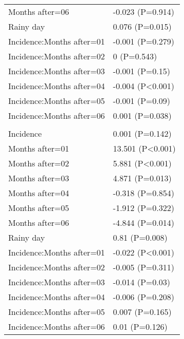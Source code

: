 \documentclass[]{article}
\begin{document}
\begin{longtable}[t]{ll}
\hspace{1em}Months after=06 & -0.023 (P=0.914)\\
\hspace{1em}Rainy day & 0.076 (P=0.015)\\
\hspace{1em}Incidence:Months after=01 & -0.001 (P=0.279)\\
\hspace{1em}Incidence:Months after=02 & 0 (P=0.543)\\
\hspace{1em}Incidence:Months after=03 & -0.001 (P=0.15)\\
\hspace{1em}Incidence:Months after=04 & -0.004 (P<0.001)\\
\hspace{1em}Incidence:Months after=05 & -0.001 (P=0.09)\\
\hspace{1em}Incidence:Months after=06 & 0.001 (P=0.038)\\
\addlinespace[1.5em]
\multicolumn{2}{l}{\textbf{Temporary not field worker}}\\
\hspace{1em}Incidence & 0.001 (P=0.142)\\
\hspace{1em}Months after=01 & 13.501 (P<0.001)\\
\hspace{1em}Months after=02 & 5.881 (P<0.001)\\
\hspace{1em}Months after=03 & 4.871 (P=0.013)\\
\hspace{1em}Months after=04 & -0.318 (P=0.854)\\
\hspace{1em}Months after=05 & -1.912 (P=0.322)\\
\hspace{1em}Months after=06 & -4.844 (P=0.014)\\
\hspace{1em}Rainy day & 0.81 (P=0.008)\\
\hspace{1em}Incidence:Months after=01 & -0.022 (P<0.001)\\
\hspace{1em}Incidence:Months after=02 & -0.005 (P=0.311)\\
\hspace{1em}Incidence:Months after=03 & -0.014 (P=0.03)\\
\hspace{1em}Incidence:Months after=04 & -0.006 (P=0.208)\\
\hspace{1em}Incidence:Months after=05 & 0.007 (P=0.165)\\
\hspace{1em}Incidence:Months after=06 & 0.01 (P=0.126)\\*
\end{longtable}
\end{document}
